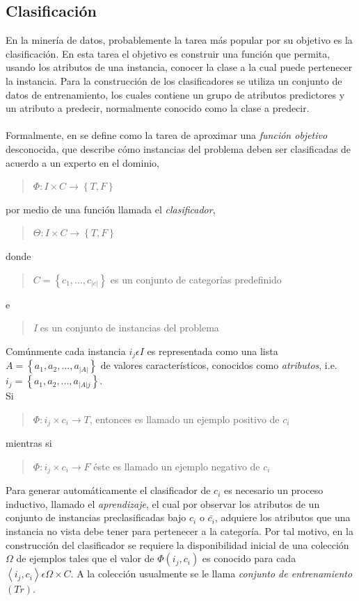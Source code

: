 \subsection{Clasificación}
En la minería de datos, probablemente la tarea más popular por su objetivo es la clasificación. En esta tarea el objetivo es construir una función que permita, usando los atributos de una instancia, conocer la clase a la cual puede pertenecer la instancia. Para la construcción de los clasificadores se utiliza un conjunto de datos de entrenamiento, los cuales contiene un grupo de atributos predictores y un atributo a predecir, normalmente conocido como la clase a predecir. \\ \\
Formalmente, en \cite{key-70} se define como la tarea de aproximar una \emph{función objetivo} desconocida, que describe cómo instancias del problema deben ser clasificadas
de acuerdo a un experto en el dominio, \begin{quote}$\Phi:I\times C\rightarrow\left\{ T,F\right\} $\end{quote}
 por medio de una función llamada el \emph{clasificador}, \begin{quote}
$\Theta:I\times C\rightarrow\left\{ T,F\right\} $
\end{quote} 
 donde \begin{quote}
 $C=\left\{ c_{1},...,c_{|c|}\right\} $ es un conjunto de categorías predefinido\end{quote}
 e \begin{quote}\emph{I} es un conjunto
de instancias del problema\end{quote} Comúnmente cada instancia $i_{j}\epsilon I$
es representada como una lista $A=\left\{ a_{1},a_{2},...,a_{|A|}\right\} $
de valores característicos, conocidos como \emph{atributos}, i.e.
$i_{j}=\left\{ a_{1},a_{2},...,a_{|A|j}\right\} $. \\Si \begin{quote}$\Phi:i_{j}\times c_{i}\rightarrow T$,
entonces es llamado un ejemplo positivo de $c_{i}$ \end{quote} mientras si \begin{quote}$\Phi:i_{j}\times c_{i}\rightarrow F$
éste es llamado un ejemplo negativo de $c_{i}$\end{quote}

Para generar automáticamente el clasificador de $c_{i}$ es necesario
un proceso inductivo, llamado el \emph{aprendizaje}, el cual por observar
los atributos de un conjunto de instancias preclasificadas bajo $c_{i}$
o $\bar{c_{i}}$, adquiere los atributos que una instancia no vista
debe tener para pertenecer a la categoría. Por tal motivo, en la construcción
del clasificador se requiere la disponibilidad inicial de una colección
$\Omega$ de ejemplos tales que el valor de $\Phi\left(i_{j},c_{i}\right)$
es conocido para cada $\left\langle i_{j},c_{i}\right\rangle \epsilon\Omega\times C$.
A la colección usualmente se le llama \emph{conjunto de entrenamiento}
$\left(Tr\right)$.
